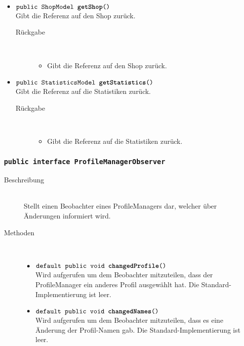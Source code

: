 \begin{description}
\begin{itemize}
		\item $\texttt{public ShopModel \textbf{getShop}()}$ \\ Gibt die Referenz auf den Shop zurück.
		\begin{description}
			\item[Rückgabe] \hfill \\
			\vspace{-.8cm}
			\begin{itemize}
				\item Gibt die Referenz auf den Shop zurück.
			\end{itemize}
		\end{description}
		
		\item $\texttt{public StatisticsModel \textbf{getStatistics}()}$ \\ Gibt die Referenz auf die Statistiken zurück.
		\begin{description}
			\item[Rückgabe] \hfill \\
			\vspace{-.8cm}
			\begin{itemize}
				\item Gibt die Referenz auf die Statistiken zurück.
			\end{itemize}
		\end{description}
	\end{itemize}
\end{description}

\subsubsection{\normalfont \texttt{public interface \textbf{ProfileManagerObserver}}}

\begin{description}
\item[Beschreibung] \hfill \\ Stellt einen Beobachter eines ProfileManagers dar, welcher über Änderungen informiert wird.

\item[Methoden] \hfill \\
	\vspace{-.8cm}
	\begin{itemize}
		\item $\texttt{default public void \textbf{changedProfile}()}$ \\ Wird aufgerufen um dem Beobachter mitzuteilen, 
		dass der ProfileManager ein anderes Profil ausgewählt hat. Die Standard-Implementierung ist leer.
		\item $\texttt{default public void \textbf{changedNames}()}$ \\ Wird aufgerufen um dem Beobachter mitzuteilen, 
		dass es eine Änderung der Profil-Namen gab. Die Standard-Implementierung ist leer.
	\end{itemize}
\end{description}

